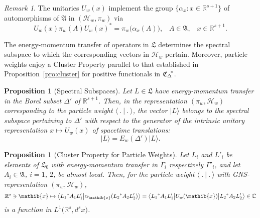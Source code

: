 \documentclass[a4paper,a4paper]{article}
\numberwithin{equation}{section}
\newcommand{\Cbb}{\mathbb{C}}
\newcommand{\Afrak}{\mathfrak{A}}
\newcommand{\Lfrak}{\mathfrak{L}}
\newcommand{\xib}{\mathib{x}}
\newcommand{\Hscr}{\mathscr{H}}
\newcommand{\Rs}{\mathbb{R}^s}
\newcommand{\Rsone}{\mathbb{R}^{s + 1}}
\newcommand{\EwDprime}{E_w ( \Delta' )}
\newcommand{\CDstar}{{\mathfrak{C}_\Delta}^{\negthickspace *}}
\newcommand{\aibx}{\alpha_\mathib{x}}
\newcommand{\ax}{\alpha_x}
\theoremstyle{definition}
\theoremstyle{plain}
\newtheorem{proposition}[definition]{Proposition}
\theoremstyle{remark}
\newtheorem*{remark*}{Remark}
\newcommand{\bset}[1]{\bigl\{ #1 \bigr\}}
\newcommand{\ket}[1]{\vert #1 \rangle}
\newcommand{\scp}[2]{\langle #1 \vert #2 \rangle}
\newcommand{\bscp}[2]{\bigl\langle #1 \big\vert #2 \bigr\rangle}
\newcommand{\bscpx}[3]{\bigl\langle #1 \big\vert #2 \big\vert #3
  \bigr\rangle}
\begin{document}
  \begin{remark*}
    The unitaries $U_w ( x )$ implement the group $\bset{\ax : x \in
    \Rsone}$ of automorphisms of $\Afrak$ in $( \Hscr_w , \pi_w )$
    via
    \begin{equation} 
      \label{eq:auto-implement}
      U_w ( x ) \pi_w ( A ) {U_w ( x )}^* = \pi_w \bigl( \ax ( A )
      \bigr) \text{,} \quad A \in \Afrak \text{,} \quad x \in \Rsone
      \text{.}
    \end{equation}
  \end{remark*}
  
  The energy-momentum transfer of operators in $\Lfrak$ determines the
  spectral subspace to which the corresponding vectors in $\Hscr_w$
  pertain. Moreover, particle weights enjoy a Cluster Property
  parallel to that established in Proposition~\ref{pro:cluster} for
  positive functionals in $\CDstar$.
  \begin{proposition}[Spectral Subspaces]
    \label{pro:spectral-subspace}
    Let $L \in \Lfrak$ have energy-momentum transfer in the Borel
    subset $\Delta'$ of\/ $\Rsone$. Then, in the representation $(
    \pi_w , \Hscr_w )$ corresponding to the particle weight
    $\scp{~.~}{~.~}$, the vector $\ket{L}$ belongs to the spectral
    subspace pertaining to $\Delta'$ with respect to the generator of
    the intrinsic unitary representation $x \mapsto U_w ( x )$ of
    spacetime translations:
    \begin{equation}
      \label{eq:energy-momentum-subspace}
      \ket{L} = \EwDprime \ket{L} \text{.}
    \end{equation}
  \end{proposition}
  \begin{proposition}[Cluster Property for Particle Weights]
    \label{pro:weights-cluster}
    Let $L_i$ and $L'_i$ be elements of $\Lfrak_0$ with
    energy-momentum transfer in $\Gamma_i$ respectively $\Gamma'_i$,
    and let $A_i \in \Afrak$, $i = 1$, $2$, be almost local.
    Then, for the particle weight $\scp{~.~}{~.~}$ with
    GNS-representation $( \pi_w , \Hscr_w )$,
    \begin{equation*}
      \Rs \ni \xib \mapsto \bscp{{L_1}^* A_1 L'_1}{\aibx ( {L_2}^* A_2
      L'_2 )} = \bscpx{{L_1}^* A_1 L'_1}{U_w ( \xib )}{{L_2}^* A_2
      L'_2} \in \Cbb
    \end{equation*}
    is a function in $L^1 \bigl( \Rs , d^s x \bigr)$.
  \end{proposition}
  
\end{document}
